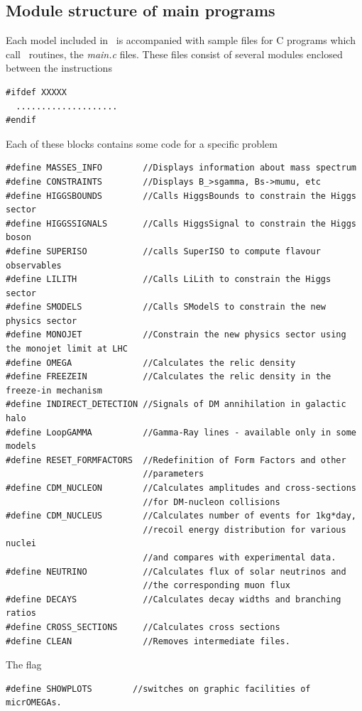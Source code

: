 \documentclass[12pt,a4paper]{article}
\begin{document}
\subsection{Module structure of main programs}
Each model included in \micro\  is accompanied with sample files for
C  programs which call \micro\ routines, the {\it main.c}  files.  
These files   consist of
several modules enclosed between the instructions
\begin{verbatim}
#ifdef XXXXX
  ....................
#endif
\end{verbatim}
Each of these blocks  contains some code for a specific problem
{\small
\begin{verbatim}
#define MASSES_INFO        //Displays information about mass spectrum 
#define CONSTRAINTS        //Displays B_>sgamma, Bs->mumu, etc
#define HIGGSBOUNDS        //Calls HiggsBounds to constrain the Higgs sector
#define HIGGSSIGNALS       //Calls HiggsSignal to constrain the Higgs boson
#define SUPERISO           //calls SuperISO to compute flavour observables
#define LILITH             //Calls LiLith to constrain the Higgs sector
#define SMODELS            //Calls SModelS to constrain the new physics sector
#define MONOJET            //Constrain the new physics sector using the monojet limit at LHC
#define OMEGA              //Calculates the relic density 
#define FREEZEIN           //Calculates the relic density in the freeze-in mechanism
#define INDIRECT_DETECTION //Signals of DM annihilation in galactic halo
#define LoopGAMMA          //Gamma-Ray lines - available only in some models
#define RESET_FORMFACTORS  //Redefinition of Form Factors and other
                           //parameters 
#define CDM_NUCLEON        //Calculates amplitudes and cross-sections
                           //for DM-nucleon collisions 
#define CDM_NUCLEUS        //Calculates number of events for 1kg*day,
                           //recoil energy distribution for various nuclei
                           //and compares with experimental data.
#define NEUTRINO           //Calculates flux of solar neutrinos and
                           //the corresponding muon flux 
#define DECAYS             //Calculates decay widths and branching ratios  
#define CROSS_SECTIONS     //Calculates cross sections 
#define CLEAN              //Removes intermediate files.
\end{verbatim}

}

The  flag \\
\begin{verbatim}
#define SHOWPLOTS        //switches on graphic facilities of micrOMEGAs.
\end{verbatim}
\end{document}

